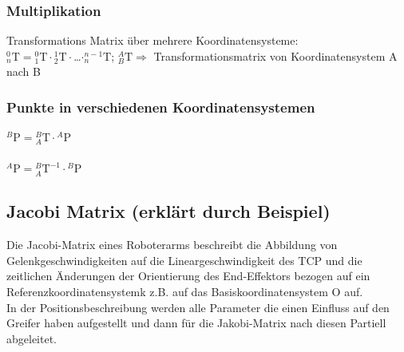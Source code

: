 	\subsubsection{Multiplikation}
		Transformations Matrix über mehrere Koordinatensysteme:\\
		
		${}^0_n\mathrm{T}={}^0_1\mathrm{T}\cdot{}^1_2\mathrm{T}\cdot{}$\ldots$\cdot{}^{n-1}_n\mathrm{T}$;
		\space\space\space\space ${}^A_B\mathrm{T} \Rightarrow$
		Transformationsmatrix von Koordinatensystem A nach B
    	
	\subsubsection{Punkte in verschiedenen Koordinatensystemen}
		${}^B\mathrm{P}={}^B_A\mathrm{T}\cdot{}^A\mathrm{P}$ \\ \\
		${}^A\mathrm{P}={}^B_A\mathrm{T}^{-1}\cdot{}^B\mathrm{P}$
		
		
		

	\subsection{Jacobi Matrix \small{ (erklärt durch Beispiel)}}
		
		
        Die Jacobi-Matrix eines Roboterarms beschreibt die Abbildung von
        Gelenkgeschwindigkeiten auf die Lineargeschwindigkeit des TCP
        und die zeitlichen Änderungen der Orientierung des End-Effektors
        bezogen auf ein Referenzkoordinatensystemk z.B. auf das
        Basiskoordinatensystem O auf. \\
        In der Positionsbeschreibung werden alle Parameter die einen Einfluss 
       auf den Greifer haben aufgestellt und dann für die Jakobi-Matrix nach diesen Partiell abgeleitet. \\
    
